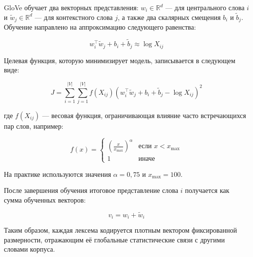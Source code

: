 \documentclass[coursework]{SCWorks}
\begin{document}
GloVe обучает два векторных представления: $w_i \in \mathbb{R}^d$ — для центрального слова $i$ и $\tilde{w}_j \in \mathbb{R}^d$ — для контекстного слова $j$, а также два скалярных смещения $b_i$ и $\tilde{b}_j$. Обучение направлено на аппроксимацию следующего равенства:

\[
w_i^\top \tilde{w}_j + b_i + \tilde{b}_j \approx \log X_{ij}
\]

Целевая функция, которую минимизирует модель, записывается в следующем виде:

\[
J = \sum_{i=1}^{|V|} \sum_{j=1}^{|V|} f(X_{ij}) \left(w_i^\top \tilde{w}_j + b_i + \tilde{b}_j - \log X_{ij} \right)^2
\]

где $f(X_{ij})$ — весовая функция, ограничивающая влияние часто встречающихся пар слов, например:

\[
f(x) = 
\begin{cases}
\left(\frac{x}{x_{\text{max}}}\right)^\alpha & \text{если } x < x_{\text{max}} \\
1 & \text{иначе}
\end{cases}
\]

На практике используются значения $\alpha = 0{,}75$ и $x_{\text{max}} = 100$.


После завершения обучения итоговое представление слова $i$ получается как сумма обученных векторов:

\[
v_i = w_i + \tilde{w}_i
\]

Таким образом, каждая лексема кодируется плотным вектором фиксированной размерности, отражающим её глобальные статистические связи с другими словами корпуса.



\end{document}
